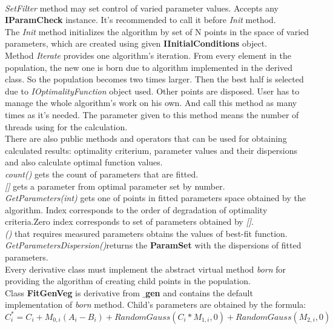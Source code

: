 \documentclass[a4paper]{article}
\begin{document}
\\
\textit{SetFilter} method may set control of varied parameter values. Accepts any \textbf{IParamCheck} instance. 
It's recommended to call it before \textit{Init} method.
\\
The \textit{Init} method initializes the algorithm by set of N points in the space of varied parameters, which are created using given \textbf{IInitialConditions} object.
\\
Method \textit{Iterate} provides one algorithm's iteration.
From every element in the population, the new one is born due to algorithm implemented in the derived class.
So the population becomes two times larger.
Then the best half is selected due to \textit{IOptimalityFunction} object used.
Other points are disposed.
User has to manage the whole algorithm's work on his own. And call this method as many times as it's needed.
The parameter given to this method means the number of threads using for the calculation.
\\
There are also public methods and operators that can be used for obtaining calculated results: optimality criterium, parameter values and their dispersions and also calculate optimal function values.\\
\textit{count()} gets the count of parameters that are fitted.\\
\textit{[]} gets a parameter from optimal parameter set by number.\\
\textit{GetParameters(int)} gets one of points in fitted parameters space obtained by the algorithm. Index corresponds to the order of degradation of optimality criteria.Zero index corresponds to set of parameters obtained by \textit{[]}.\\
\textit{()} that requires measured parameters obtains the values of best-fit function.\\
\textit{GetParametersDispersion()}returns the \textbf{ParamSet} with the dispersions of fitted parameters.
\\
Every derivative class must implement the abstract virtual method \textit{born} for providing the algorithm of creating child points in the population.
\\
Class \textbf{FitGenVeg} is derivative from \textbf{$\_$gen} and contains the default implementation of \textit{born} method. Child's parameters are obtained by the formula:
\begin{equation}
C^*_i = C_i + 
M_{0,i}(A_i - B_i) + 
RandomGauss(C_i * M_{1,i},0) + 
RandomGauss(M_{2,i},0) 
\label{born_veg}
\end{equation}
\end{document}
